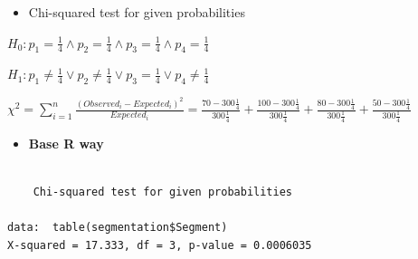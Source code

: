 \documentclass[
  ignorenonframetext,
]{beamer}
\newenvironment{Shaded}{\begin{snugshade}}{\end{snugshade}}
\newcommand{\AttributeTok}[1]{\textcolor[rgb]{0.40,0.45,0.13}{#1}}
\newcommand{\DecValTok}[1]{\textcolor[rgb]{0.68,0.00,0.00}{#1}}
\newcommand{\FunctionTok}[1]{\textcolor[rgb]{0.28,0.35,0.67}{#1}}
\newcommand{\NormalTok}[1]{\textcolor[rgb]{0.00,0.23,0.31}{#1}}
\newcommand{\OtherTok}[1]{\textcolor[rgb]{0.00,0.23,0.31}{#1}}
\newcommand{\SpecialCharTok}[1]{\textcolor[rgb]{0.37,0.37,0.37}{#1}}
\providecommand{\tightlist}{%
  \setlength{\itemsep}{0pt}\setlength{\parskip}{0pt}}\usepackage{longtable,booktabs,array}
\begin{document}
\begin{frame}[fragile]{}
\label{section-4}
\begin{itemize}
\tightlist
\item
  Chi-squared test for given probabilities
\end{itemize}

\(H_0: p_1 = \frac{1}{4} \land p_2 = \frac{1}{4} \land p_3 = \frac{1}{4} \land p_4 = \frac{1}{4}\)

\(H_1: p_1 \neq \frac{1}{4} \lor p_2 \neq \frac{1}{4} \lor p_3 = \frac{1}{4} \lor p_4 \neq \frac{1}{4}\)

\(\chi^2 = \sum_{i=1}^n \frac{(Observed_i - Expected_i)^2}{Expected_i} = \frac{70 - 300\frac{1}{4}}{300\frac{1}{4}} + \frac{100 - 300\frac{1}{4}}{300\frac{1}{4}} + \frac{80 - 300\frac{1}{4}}{300\frac{1}{4}} + \frac{50 - 300\frac{1}{4}}{300\frac{1}{4}}\)

\begin{itemize}
\tightlist
\item
  \textbf{Base R way}
\end{itemize}

\tiny

\begin{Shaded}
\end{Shaded}

\begin{verbatim}

    Chi-squared test for given probabilities

data:  table(segmentation$Segment)
X-squared = 17.333, df = 3, p-value = 0.0006035
\end{verbatim}
\end{frame}
\end{document}
